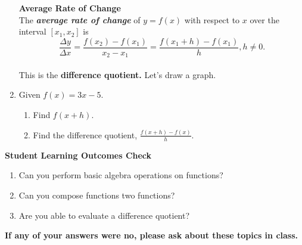\documentclass[11pt]{article}
\begin{document}
\begin{enumerate}
\textbf{Average Rate of Change}\\


 The \textbf{\emph{average rate of change}} of $y=f(x)$ with respect to $x$ over the interval $[x_1,x_2]$ is
 $$\frac{\Delta y}{\Delta x}=\frac{f(x_2)-f(x_1)}{x_2-x_1}=\frac{f(x_1+h)-f(x_1)}{h}, h\neq 0.$$\\ 
 
 This is the \textbf{difference quotient.}  Let's draw a graph.
 \vfill
 
 \item Given $f(x)=3x-5$.
 \begin{enumerate}
 \item Find $f(x+h)$.\\[.5in]
 \item Find the difference quotient, $\frac{f(x+h)-f(x)}{h}$.\\[1.5in]
 \end{enumerate}





\end{enumerate}

\noindent \textbf{Student Learning Outcomes Check}

\begin{enumerate}
\item Can you perform basic algebra operations on functions?
\item Can you compose functions two functions?
\item Are you able to evaluate a difference quotient?


\end{enumerate}

\noindent \textbf{If any of your answers were no, please ask about these topics in class.}
\end{document}
